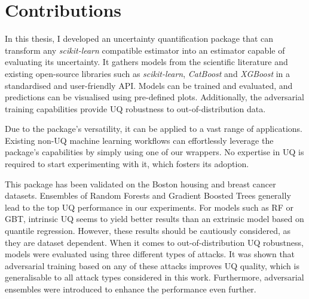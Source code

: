 
\section{Contributions}

In this thesis, I developed an uncertainty quantification package that can transform any \textit{scikit-learn} compatible estimator into an estimator capable of evaluating its uncertainty. It gathers models from the scientific literature and existing open-source libraries such as \textit{scikit-learn}, \textit{CatBoost} and \textit{XGBoost} in a standardised and user-friendly API. Models can be trained and evaluated, and predictions can be visualised using pre-defined plots. Additionally, the adversarial training capabilities provide UQ robustness to out-of-distribution data.

Due to the package's versatility, it can be applied to a vast range of applications. Existing non-UQ machine learning workflows can effortlessly leverage the package's capabilities by simply using one of our wrappers. No expertise in UQ is required to start experimenting with it, which fosters its adoption.  

This package has been validated on the Boston housing and breast cancer datasets. Ensembles of Random Forests and Gradient Boosted Trees generally lead to the top UQ performance in our experiments. For models such as RF or GBT, intrinsic UQ seems to yield better results than an extrinsic model based on quantile regression. However, these results should be cautiously considered, as they are dataset dependent. 
When it comes to out-of-distribution UQ robustness, models were evaluated using three different types of attacks. It was shown that adversarial training based on any of these attacks improves UQ quality, which is generalisable to all attack types considered in this work. Furthermore, adversarial ensembles were introduced to enhance the performance even further.   
\newpage 


